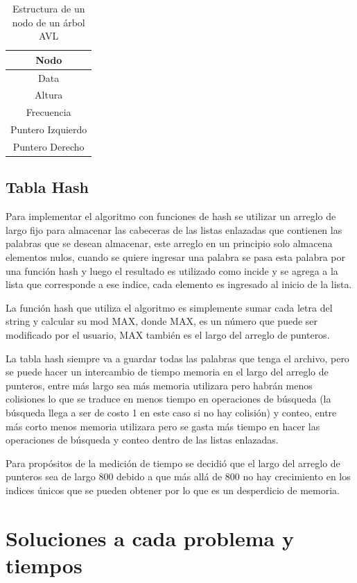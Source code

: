 \documentclass[12pt,letterpaper]{scrartcl}
\begin{document}
\begin{table}[!h]
\centering
\caption{Estructura de un nodo de un árbol AVL}
\label{table:nodo}
\begin{tabular}{|c|}
\hline 
\textbf{Nodo} \\ 
\hline 
Data \\ 
\hline
Altura\\ 
\hline
Frecuencia\\ 
\hline 
Puntero Izquierdo\\ 
\hline
Puntero Derecho\\ 
\hline
\end{tabular} 
\end{table}

\subsection{Tabla Hash}

Para implementar el algoritmo con funciones de hash se utilizar un arreglo de largo fijo para almacenar las cabeceras de las listas enlazadas que contienen las palabras que se desean almacenar, este arreglo en un principio solo almacena elementos nulos, cuando se quiere ingresar una palabra se pasa esta palabra por una función hash y luego el resultado es utilizado como incide y se agrega a la lista que corresponde a ese indice, cada elemento es ingresado al inicio de la lista.

La función hash que utiliza el algoritmo es simplemente sumar cada letra del string y calcular su mod MAX, donde MAX, es un número que puede ser modificado por el usuario, MAX también es el largo del arreglo de punteros.

La tabla hash siempre va a guardar todas las palabras que tenga el archivo, pero se puede hacer un intercambio de tiempo memoria en el largo del arreglo de punteros, entre más largo sea más memoria utilizara pero habrán menos colisiones lo que se traduce en menos tiempo en operaciones de búsqueda (la búsqueda llega a ser de costo 1 en este caso si no hay colisión) y conteo, entre más corto menos memoria utilizara pero se gasta más tiempo en hacer las operaciones de búsqueda y conteo dentro de las listas enlazadas.

Para propósitos de la medición de tiempo se decidió que el largo del arreglo de punteros sea de largo 800 debido a que más allá de 800 no hay crecimiento en los indices únicos que se pueden obtener por lo que es un desperdicio de memoria.

\section{Soluciones a cada problema y tiempos}
\end{document}
